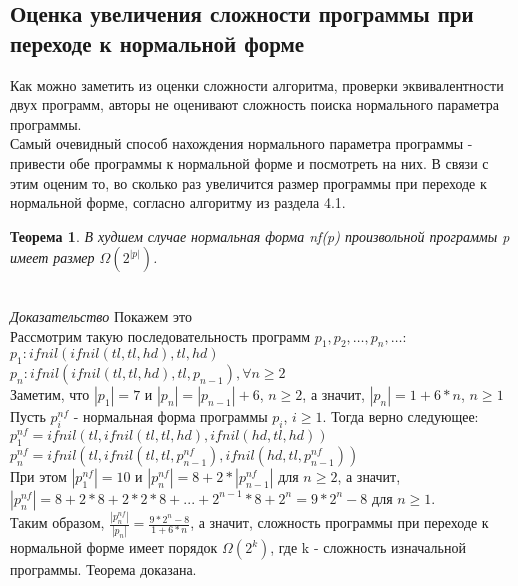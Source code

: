 \documentclass[12pt]{article}
\newtheorem{thm}{Теорема}[section]
\begin{document}
\subsection{Оценка увеличения сложности программы при переходе к нормальной форме}
Как можно заметить из оценки сложности алгоритма, проверки эквивалентности двух программ, авторы не оценивают сложность поиска нормального параметра программы.\\ 
Самый очевидный способ нахождения нормального параметра программы - привести обе программы к нормальной форме и посмотреть на них. В связи с этим оценим то, во сколько раз увеличится размер программы при переходе к нормальной форме, согласно алгоритму из раздела 4.1.\\
\begin{thm} В худшем случае нормальная форма nf(p) произвольной программы p имеет размер $\Omega(2^{|p|})$.\end{thm}\\
\emph{Доказательство} Покажем это \\
Рассмотрим такую последовательность программ $p_{1}, p_{2}, \dots, p_{n}, \dots$:\\
$p_{1}: ifnil(ifnil(tl, tl, hd), tl, hd)$\\
$p_{n}: ifnil(ifnil(tl, tl, hd), tl, p_{n-1}), \forall n \ge 2$\\
Заметим, что $|p_{1}| = 7$ и $|p_{n}| = |p_{n-1}| + 6$, $n \ge 2$, а значит, $|p_{n}| = 1 + 6 * n$, $n \ge 1$\\
Пусть \(p_{i}^{nf}\) - нормальная форма программы $p_{i}$, $i \ge 1$. Тогда верно следующее:\\
$p^{nf}_{1} = ifnil(tl, ifnil(tl, tl, hd), ifnil(hd, tl, hd))$\\
$p^{nf}_{n} = ifnil(tl, ifnil(tl, tl, p^{nf}_{n-1}), ifnil(hd, tl, p^{nf}_{n-1}))$\\
При этом $|p^{nf}_1| = 10$ и $|p^{nf}_{n}| = 8 + 2 * |p^{nf}_{n-1}|$ для $n \ge 2$, а значит, $|p^{nf}_n| = 8 + 2 * 8 + 2 * 2 * 8 + ... + 2^{n-1} * 8 + 2^{n} = 9 * 2^{n} - 8$ для $n \ge 1$.\\
Таким образом, $\frac{|p^{nf}_{n}|}{|p_{n}|} = \frac{9 * 2^{n} - 8}{1 + 6 * n}$, а значит, сложность программы при переходе к нормальной форме имеет порядок $\Omega(2^{k})$, где k - сложность изначальной программы. Теорема доказана.
\end{document}
